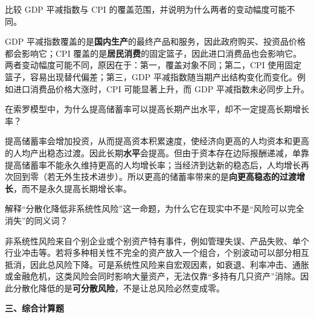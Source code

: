 \begin{question}
比较 GDP 平减指数与 CPI 的覆盖范围，并说明为什么两者的变动幅度可能不同。

\begin{solution}
GDP 平减指数覆盖的是\textbf{国内生产}的最终产品和服务，因此政府购买、投资品价格都会影响它；CPI 覆盖的是\textbf{居民消费}的固定篮子，因此进口消费品也会影响它。两者变动幅度可能不同，原因在于：第一，覆盖对象不同；第二，CPI 使用固定篮子，容易出现替代偏差；第三，GDP 平减指数随当期产出结构变化而变化。例如进口消费品价格大涨时，CPI 可能显著上升，而 GDP 平减指数未必同步上升。
\end{solution}
\end{question}

\begin{question}
在索罗模型中，为什么提高储蓄率可以提高长期产出水平，却不一定提高长期增长率？

\begin{solution}
提高储蓄率会增加投资，从而提高资本积累速度，使经济向更高的人均资本和更高的人均产出稳态过渡。因此长期\textbf{水平}会提高。但由于资本存在边际报酬递减，单靠提高储蓄率不能永久维持更高的人均增长率；当经济到达新的稳态后，人均增长再次回到零（若无外生技术进步）。所以更高的储蓄率带来的是\textbf{向更高稳态的过渡增长}，而不是永久提高长期增长率。
\end{solution}
\end{question}

\begin{question}
解释“分散化降低非系统性风险”这一命题，为什么它在现实中不是“风险可以完全消失”的同义词？

\begin{solution}
非系统性风险来自个别企业或个别资产特有事件，例如管理失误、产品失败、单个行业冲击等。若将多种相关性不完全的资产放入一个组合，个别波动可以部分相互抵消，因此总风险下降。可是系统性风险来自宏观因素，如衰退、利率冲击、通胀或金融危机，这类风险会同时影响大量资产，无法仅靠“多持有几只资产”消除。因此分散化降低的是\textbf{可分散风险}，不是让总风险必然变成零。
\end{solution}
\end{question}

\textbf{三、综合计算题}

